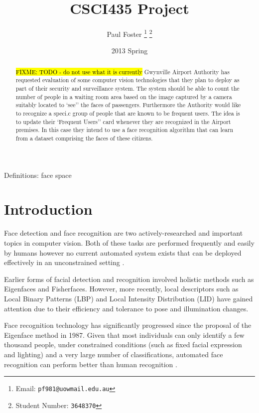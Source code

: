 \documentclass{article}
\begin{document}
\title{CSCI435 Project}
\author{Paul Foster
	\thanks{Email: \texttt{pf981@uowmail.edu.au}}
	\thanks{Student Number: \texttt{3648370}}}
\date{2013 Spring}

\maketitle

\renewcommand\abstractname{Executive Summary}
\begin{abstract}
\hl{FIXME: TODO - do not use what it is currently}
Gwynville Airport Authority has requested evaluation of some computer vision
technologies that they plan to deploy as part of their security and surveillance system.
The system should be able to count the number of people in a waiting room area based
on the image captured by a camera suitably located to `see'' the faces of passengers. Furthermore the Authority would like to recognize a speci.c group of people that are known
to be frequent users. The idea is to update their `Frequent Users'' card whenever they
are recognized in the Airport premises. In this case they intend to use a face recognition
algorithm that can learn from a dataset comprising the faces of these citizens.
\end{abstract}

Definitions: face space

\section{Introduction}
Face detection and face recognition are two actively-researched and important topics in computer vision. Both of these tasks are performed frequently and easily by humans however no current automated system exists that can be deployed effectively in an unconstrained setting \cite{sinha2006face}.

Earlier forms of facial detection and recognition involved holistic methods such as Eigenfaces\cite{turk1991eigenfaces} and Fisherfaces\cite{belhumeur1997eigenfaces}. However, more recently, local descriptors such as Local Binary Patterns (LBP)\cite{ahonen2004face} and Local Intensity Distribution (LID)\cite{nguyen2011local} have gained attention due to their efficiency and tolerance to pose and illumination changes.

Face recognition technology has significantly progressed since the proposal of the Eigenface method in 1987. Given that most individuals can only identify a few thousand people, under constrained conditions (such as fixed facial expression and lighting) and a very large number of classifications, automated face recognition can perform better than human recognition \cite{li2011handbook}.
\end{document}
